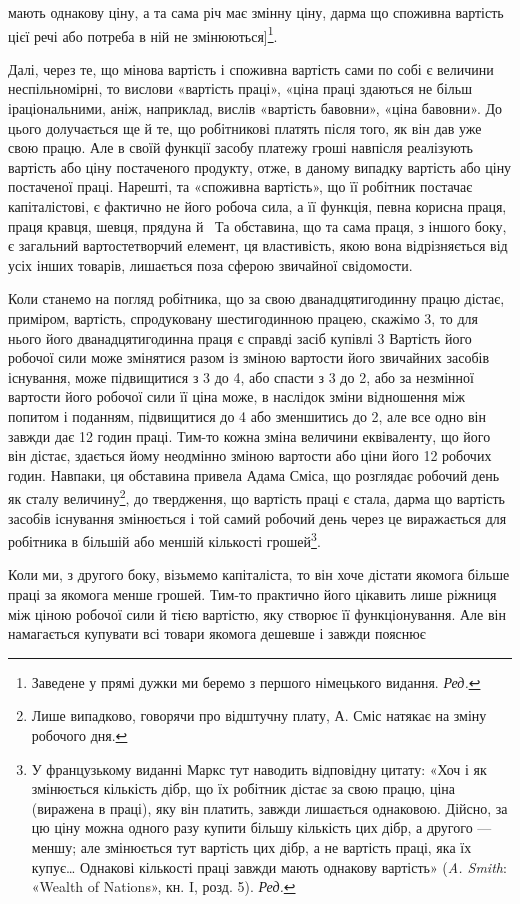 \parcont{}  %
мають однакову ціну, а та сама річ має змінну ціну, дарма що
споживна вартість цієї речі або потреба в ній не змінюються]\footnote*{
Заведене у прямі дужки ми беремо з першого німецького видання. \emph{Ред.}
}.

Далі, через те, що мінова вартість і споживна вартість сами
по собі є величини неспільномірні, то вислови «вартість праці»,
«ціна праці здаються не більш іраціональними, аніж, наприклад,
вислів «вартість бавовни», «ціна бавовни». До цього долучається
ще й те, що робітникові платять після того, як він дав
уже свою працю. Але в своїй функції засобу платежу гроші
навпісля реалізують вартість або ціну постаченого продукту,
отже, в даному випадку вартість або ціну постаченої праці.
Нарешті, та «споживна вартість», що її робітник постачає капіталістові,
є фактично не його робоча сила, а її функція, певна
корисна праця, праця кравця, шевця, прядуна й~ Та обставина,
що та сама праця, з іншого боку, є загальний вартостетворчий
елемент, ця властивість, якою вона відрізняється від усіх
інших товарів, лишається поза сферою звичайної свідомости.

Коли станемо на погляд робітника, що за свою дванадцятигодинну
працю дістає, приміром, вартість, спродуковану шестигодинною
працею, скажімо 3, то для нього його дванадцятигодинна
праця є справді засіб купівлі 3 Вартість
його робочої сили може змінятися разом із зміною вартости його
звичайних засобів існування, може підвищитися з 3 до 4,
або спасти з 3 до 2, або за незмінної вартости його робочої
сили її ціна може, в наслідок зміни відношення між попитом
і поданням, підвищитися до 4 або зменшитись до 2,
але все одно він завжди дає 12 годин праці. Тим-то кожна
зміна величини еквіваленту, що його він дістає, здається йому
неодмінно зміною вартости або ціни його 12 робочих годин.
Навпаки, ця обставина привела Адама Сміса, що розглядає
робочий день як сталу величину\footnote{
Лише випадково, говорячи про відштучну плату, А. Сміс натякає
на зміну робочого дня.
}, до твердження, що вартість
праці є стала, дарма що вартість засобів існування змінюється
і той самий робочий день через це виражається для робітника
в більшій або меншій кількості грошей\footnote*{
У французькому виданні Маркс тут наводить відповідну цитату:
«Хоч і як змінюється кількість дібр, що їх робітник дістає за свою
працю, ціна (виражена в праці), яку він платить, завжди лишається
однаковою. Дійсно, за цю ціну можна одного разу купити більшу кількість
цих дібр, а другого — меншу; але змінюється тут вартість цих
дібр, а не вартість праці, яка їх купує\dots{} Однакові кількості праці
завжди мають однакову вартість» (\emph{A. Smith}: «Wealth of Nations», кн. I,
розд. 5). \emph{Ред.}
}.

Коли ми, з другого боку, візьмемо капіталіста, то він хоче
дістати якомога більше праці за якомога менше грошей. Тим-то
практично його цікавить лише ріжниця між ціною робочої сили
й тією вартістю, яку створює її функціонування. Але він намагається
купувати всі товари якомога дешевше і завжди пояснює
\parbreak{}  %
